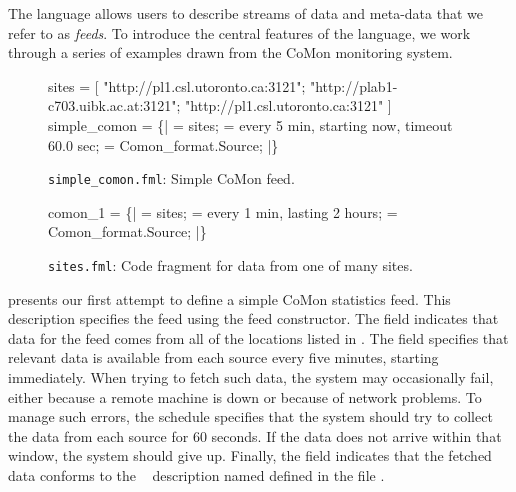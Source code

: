 The \padsd{} language allows users to describe streams of data and
meta-data that we refer to as {\em feeds}.  
To introduce the central features of the language,
we work through a series of examples drawn from the CoMon monitoring system.

\begin{figure}[t]
\begin{code}
 sites = 
  [
  "http://pl1.csl.utoronto.ca:3121";
  "http://plab1-c703.uibk.ac.at:3121";
  "http://pl1.csl.utoronto.ca:3121"
  ] 
 simple_comon =
   \{|
      =  sites;
     = every 5 min, starting now, 
               timeout 60.0 sec; 
       = Comon_format.Source;  
  |\}
\end{code}
\shrink
\caption{\texttt{simple\_comon.fml}:  Simple CoMon feed.} 
\label{fig:simplecomon}
\end{figure}

\begin{figure}[t]
\begin{code}
 comon_1 =
   \{|
      =  sites;
     = every 1 min, 
              lasting 2 hours;
       = Comon_format.Source;
  |\}
\end{code}
\shrink
\caption{\texttt{sites.fml}:  Code fragment for data from one of many sites.}
\label{fig:comon_1}
\end{figure}


 presents our first attempt to define
a simple CoMon statistics feed.  This description
specifies the  feed
using the  feed constructor.  The  field
indicates that data for the feed comes from all of the locations
listed in .  The  field specifies that relevant
data is available from each source every five minutes, starting immediately.
When trying to fetch such data, the system may occasionally fail,
either because a remote machine is down or because of network
problems. To manage such errors, the schedule specifies that the
system should try to collect the data from each source for 60 seconds.
If the data does not arrive within that window, the system should give
up. Finally, the  field indicates that the fetched data
conforms to the \padsml{}~\cite{mandelbaum+:pads-ml} description named
 defined in the file .

